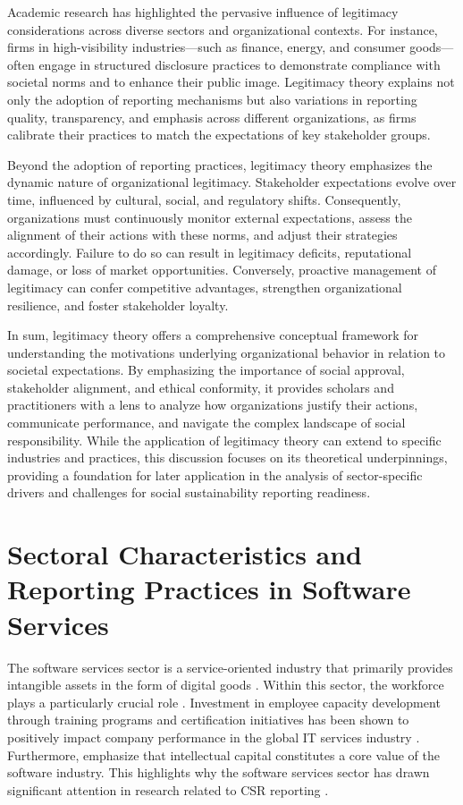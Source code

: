 Academic research has highlighted the pervasive influence of legitimacy considerations across diverse sectors 
and organizational contexts. For instance, firms in high-visibility industries—such as finance, energy, and 
consumer goods—often engage in structured disclosure practices to demonstrate compliance with societal norms 
and to enhance their public image. Legitimacy theory explains not only the adoption of reporting mechanisms 
but also variations in reporting quality, transparency, and emphasis across different organizations, as firms 
calibrate their practices to match the expectations of key stakeholder groups.

Beyond the adoption of reporting practices, legitimacy theory emphasizes the dynamic nature of organizational 
legitimacy. Stakeholder expectations evolve over time, influenced by cultural, social, and regulatory shifts.
Consequently, organizations must continuously monitor external expectations, assess the alignment of their actions 
with these norms, and adjust their strategies accordingly. Failure to do so can result in legitimacy deficits, 
reputational damage, or loss of market opportunities. Conversely, proactive management of legitimacy can confer 
competitive advantages, strengthen organizational resilience, and foster stakeholder loyalty.

In sum, legitimacy theory offers a comprehensive conceptual framework for understanding the motivations underlying 
organizational behavior in relation to societal expectations. By emphasizing the importance of social approval, 
stakeholder alignment, and ethical conformity, it provides scholars and practitioners with a lens to analyze how 
organizations justify their actions, communicate performance, and navigate the complex landscape of social responsibility. 
While the application of legitimacy theory can extend to specific industries and practices, this discussion focuses on its 
theoretical underpinnings, providing a foundation for later application in the analysis of sector-specific drivers and 
challenges for social sustainability reporting readiness.



\section{Sectoral Characteristics and Reporting Practices in Software Services}

The software services sector is a service-oriented industry that primarily provides intangible assets 
in the form of digital goods \parencite{Buxmann2015}. Within this sector, the workforce plays a particularly 
crucial role \parencite{Buxmann2015}. Investment in employee capacity development through training programs 
and certification initiatives has been shown to positively impact company performance in the global IT 
services industry \parencite{Chatterjee2017}. Furthermore, \textcite{Nowak2000} emphasize that intellectual 
capital constitutes a core value of the software industry. This highlights why the software services sector 
has drawn significant attention in research related to CSR reporting \parencite{Holder-Webb2009}.

